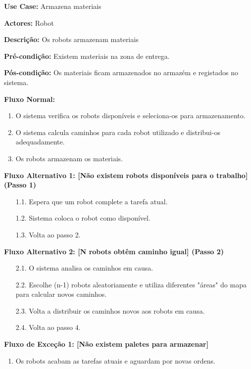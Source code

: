 \documentclass[a4paper]{report}
\begin{document}
\textbf{Use Case:} Armazena materiais

\textbf{Actores:} Robot

\textbf{Descrição:} Os robots armazenam materiais  


\textbf{Pré-condição:}  Existem materiais na zona de entrega.

\textbf{Pós-condição:} Os materiais ficam armazenados no armazém e registados no sistema.

\textbf{Fluxo Normal:} 
\begin{enumerate}

    \item  O sistema verifica os robots disponíveis e seleciona-os para armazenamento.
    \item O sistema calcula caminhos para cada robot utilizado e distribui-os adequadamente.
    \item Os robots armazenam os materiais.

\end{enumerate}

\textbf{Fluxo Alternativo 1: [Não existem robots disponíveis para o trabalho] (Passo 1)}
\begin{enumerate}
    \item [1.1.] Espera que um robot complete a tarefa atual.
    \item [1.2.] Sistema coloca o robot como disponível.
    \item [1.3.] Volta ao passo 2.
\end{enumerate}


\textbf{Fluxo Alternativo 2: [N robots obtêm caminho igual] (Passo 2)}
\begin{enumerate}
    \item [2.1.] O sistema analisa os caminhos em causa.
    \item [2.2.] Escolhe (n-1) robots aleatoriamente e utiliza diferentes "áreas" do mapa para calcular novos caminhos.
    \item [2.3.] Volta a distribuir os caminhos novos aos robots em causa.
    \item [2.4.] Volta ao passo 4.
\end{enumerate}

\textbf{Fluxo de Exceção 1: [Não existem paletes para armazenar]}
\begin{enumerate}
    \item Os robots acabam as tarefas atuais e aguardam por novas ordens.
\end{enumerate}
\end{document}
